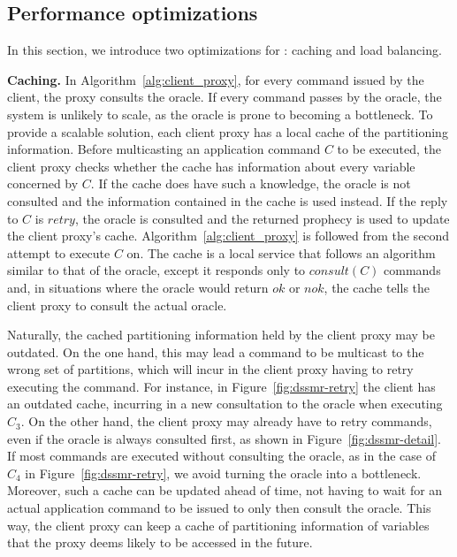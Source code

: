 \subsection{Performance optimizations}
\label{sec:dssmr-optm}

In this section, we introduce two optimizations for \dssmr{}: caching and load
balancing.

\textbf{Caching.} In Algorithm~\ref{alg:client_proxy}, for every command issued
by the client, the proxy consults the oracle. If every command passes by the
oracle, the system is unlikely to scale, as the oracle is prone to becoming a
bottleneck. To provide a scalable solution, each client proxy has a local cache
of the partitioning information. Before multicasting an application command $C$
to be executed, the client proxy checks whether the cache has information about
every variable concerned by $C$. If the cache does have such a knowledge, the
oracle is not consulted and the information contained in the cache is used
instead. If the reply to $C$ is $retry$, the oracle is consulted and the
returned prophecy is used to update the client proxy's cache.
Algorithm~\ref{alg:client_proxy} is followed from the second attempt to execute
$C$ on. The cache is a local service that follows an algorithm similar to that
of the oracle, except it responds only to $consult(C)$ commands and, in
situations where the oracle would return $ok$ or $nok$, the cache tells the
client proxy to consult the actual oracle.


Naturally, the cached partitioning information held by the client proxy may be
outdated. On the one hand, this may lead a command to be multicast to the
wrong set of partitions, which will incur in the client proxy having to
retry executing the command. For instance, in Figure~\ref{fig:dssmr-retry} the
client has an outdated cache, incurring in a new consultation to the oracle
when executing $C_3$. On the other hand, the client proxy may already have to
retry commands, even if the oracle is always consulted first, as shown in
Figure~\ref{fig:dssmr-detail}. If most commands are executed without consulting
the oracle, as in the case of $C_4$ in Figure~\ref{fig:dssmr-retry}, we avoid
turning the oracle into a bottleneck. Moreover, such a cache can be updated
ahead of time, not having to wait for an actual application command to be issued
to only then consult the oracle. This way, the client proxy can keep a cache of
partitioning information of variables that the proxy deems likely to be accessed
in the future.

